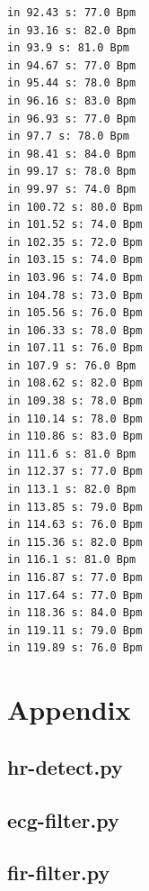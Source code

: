 \documentclass[a4paper,12pt]{article}
\begin{document}
\begin{lstlisting}
in 92.43 s: 77.0 Bpm
in 93.16 s: 82.0 Bpm
in 93.9 s: 81.0 Bpm
in 94.67 s: 77.0 Bpm
in 95.44 s: 78.0 Bpm
in 96.16 s: 83.0 Bpm
in 96.93 s: 77.0 Bpm
in 97.7 s: 78.0 Bpm
in 98.41 s: 84.0 Bpm
in 99.17 s: 78.0 Bpm
in 99.97 s: 74.0 Bpm
in 100.72 s: 80.0 Bpm
in 101.52 s: 74.0 Bpm
in 102.35 s: 72.0 Bpm
in 103.15 s: 74.0 Bpm
in 103.96 s: 74.0 Bpm
in 104.78 s: 73.0 Bpm
in 105.56 s: 76.0 Bpm
in 106.33 s: 78.0 Bpm
in 107.11 s: 76.0 Bpm
in 107.9 s: 76.0 Bpm
in 108.62 s: 82.0 Bpm
in 109.38 s: 78.0 Bpm
in 110.14 s: 78.0 Bpm
in 110.86 s: 83.0 Bpm
in 111.6 s: 81.0 Bpm
in 112.37 s: 77.0 Bpm
in 113.1 s: 82.0 Bpm
in 113.85 s: 79.0 Bpm
in 114.63 s: 76.0 Bpm
in 115.36 s: 82.0 Bpm
in 116.1 s: 81.0 Bpm
in 116.87 s: 77.0 Bpm
in 117.64 s: 77.0 Bpm
in 118.36 s: 84.0 Bpm
in 119.11 s: 79.0 Bpm
in 119.89 s: 76.0 Bpm
\end{lstlisting}

\clearpage

\section{Appendix}
\subsection{hr-detect.py}

\subsection{ecg-filter.py}

\subsection{fir-filter.py}

\end{document}
